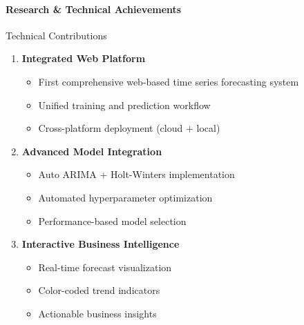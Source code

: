 %
%
%




{ 
	\framesubtitle{Research \& Technical Achievements}
	
	\begin{block}{Technical Contributions}
		\begin{enumerate}
			\item \textbf{Integrated Web Platform}
			\begin{itemize}
				\item First comprehensive web-based time series forecasting system
				\item Unified training and prediction workflow
				\item Cross-platform deployment (cloud + local)
			\end{itemize}
			
			\item \textbf{Advanced Model Integration}
			\begin{itemize}
				\item Auto ARIMA + Holt-Winters implementation
				\item Automated hyperparameter optimization
				\item Performance-based model selection
			\end{itemize}
			
			\item \textbf{Interactive Business Intelligence}
			\begin{itemize}
				\item Real-time forecast visualization
				\item Color-coded trend indicators
				\item Actionable business insights
			\end{itemize}
		\end{enumerate}
	\end{block}
	
	\begin{figure}
		\centering
{}
\end{figure}}
